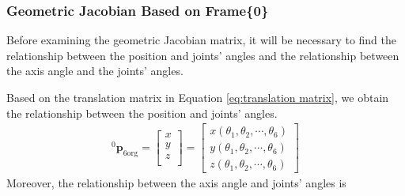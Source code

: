 \subsubsection{Geometric Jacobian Based on Frame\{0\}}
\hspace*{6mm}Before examining the geometric Jacobian matrix, it will be necessary to find the relationship between the position and joints' angles and the relationship between the axis angle and the joints' angles.
\par
Based on the translation matrix in Equation \ref{eq:translation matrix}, we obtain the relationship between the position and joints' angles.
\begin{equation}
\label{eq:lin vel}
\begin{split}
^0\boldsymbol{p}_\mathrm{6org}
= 
\begin{bmatrix}
x\\
y\\
z\\
\end{bmatrix} 
=
\begin{bmatrix}
x(\theta _1, \theta _2, \cdots, \theta _6)\\
y(\theta _1, \theta _2, \cdots, \theta _6)\\
z(\theta _1, \theta _2, \cdots, \theta _6)
\end{bmatrix} 
\end{split}
\end{equation}
Moreover, the relationship between the axis angle and joints' angles is 
